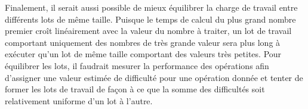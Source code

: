 Finalement, il serait aussi possible de mieux équilibrer la charge de travail entre différents lots de même taille. Puisque le temps de calcul du plus grand nombre premier croît linéairement avec la valeur du nombre à traiter, un lot de travail comportant uniquement des nombres de très grande valeur sera plus long à exécuter qu'un lot de même taille comportant des valeurs très petites. Pour équilibrer les lots, il faudrait mesurer la performance des opérations afin d'assigner une valeur estimée de difficulté pour une opération donnée et tenter de former les lots de travail de façon à ce que la somme des difficultés soit relativement uniforme d'un lot à l'autre. 




%
%
%
%
%
%
